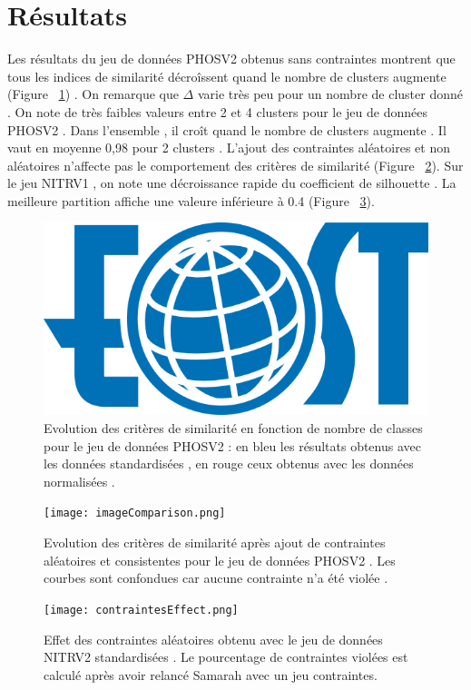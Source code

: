 \documentclass[11pt, openany]{report}
\begin{document}
\section{Résultats}
Les résultats  du jeu de données PHOSV2 obtenus sans contraintes montrent que tous les indices de similarité décroîssent quand le nombre de clusters augmente (Figure ~\ref{fig:criteriaEvolution}) .
On remarque que $\Delta$ varie très peu pour un nombre de cluster donné . On note de très faibles valeurs entre 2 et 4 clusters pour le jeu de données PHOSV2 . Dans l'ensemble , il croît  quand le nombre de clusters augmente . Il vaut en moyenne  0,98 pour 2  clusters . L'ajout des contraintes aléatoires et non aléatoires n'affecte pas le comportement des critères de similarité  (Figure ~\ref{fig:phosvNoEvolution}).
Sur le jeu NITRV1 , on note une décroissance rapide du coefficient de silhouette . La meilleure partition affiche une valeure inférieure à 0.4 (Figure ~\ref{fig:nitrvEvolution}).

\begin{figure}[H]
  \centering
  \includegraphics[width=0.6\linewidth]{eost.png}
  \caption{Evolution des critères de similarité en fonction de nombre de classes pour le jeu de données PHOSV2 : en bleu les résultats obtenus avec les données standardisées , en rouge ceux obtenus avec les données normalisées .}
  \label{fig:criteriaEvolution}
\end{figure}

\begin{figure}[H]
  \centering
  \texttt{[image: imageComparison.png]}
  \caption{Evolution des critères de similarité après ajout de contraintes aléatoires et consistentes pour  le jeu de données PHOSV2 . Les courbes sont confondues car aucune contrainte n'a été violée .}
  \label{fig:phosvNoEvolution}
\end{figure}

\begin{figure}[H]
  \centering
  \texttt{[image: contraintesEffect.png]}
  \caption{Effet des contraintes aléatoires obtenu avec le jeu de données NITRV2 standardisées . Le pourcentage  de contraintes violées  est calculé après avoir relancé Samarah avec un jeu contraintes. }
  \label{fig:nitrvEvolution}
\end{figure}
\end{document}
